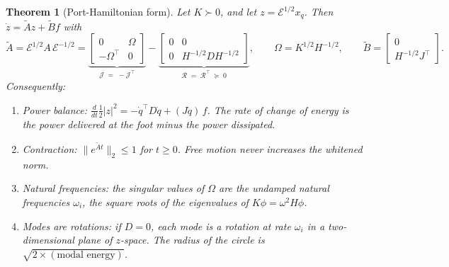 \documentclass[11pt]{article}
\newtheorem{theorem}{Theorem}
\theoremstyle{definition}
\theoremstyle{remark}
\newcommand{\Em}{\mathcal{E}}         %
\newcommand{\At}{\tilde{A}}
\newcommand{\Jt}{\mathcal{J}}
\newcommand{\Rt}{\mathcal{R}}
\begin{document}
\begin{theorem}[Port-Hamiltonian form]\label{thm:ph}
Let $K\succ0$, and let $z=\Em^{1/2}x_q$. Then $\dot z=\At z+\tilde Bf$ with
\begin{equation}\label{eq:ph}
  \At=\Em^{1/2}A\,\Em^{-1/2}
  =\underbrace{\begin{bmatrix}0&\Omega\\-\Omega^\top&0\end{bmatrix}}_{\Jt\;=\;-\Jt^\top}
  -\underbrace{\begin{bmatrix}0&0\\0&H^{-1/2}DH^{-1/2}\end{bmatrix}}_{\Rt\;=\;\Rt^\top\;\succeq\;0},
  \qquad \Omega=K^{1/2}H^{-1/2},\qquad
  \tilde B=\begin{bmatrix}0\\H^{-1/2}J^\top\end{bmatrix}.
\end{equation}
Consequently:
\begin{enumerate}[label=(\alph*)]
  \item \emph{Power balance:}
        $\frac{d}{dt}\frac12|z|^2=-\dot q^\top D\dot q+(J\dot q)\,f$. The rate of change
        of energy is the power delivered at the foot minus the power dissipated.
  \item \emph{Contraction:} $\|e^{\At t}\|_2\le1$ for $t\ge0$. Free motion never increases
        the whitened norm.
  \item \emph{Natural frequencies:} the singular values of $\Omega$ are the undamped
        natural frequencies $\omega_i$, the square roots of the eigenvalues of
        $K\phi=\omega^2H\phi$.
  \item \emph{Modes are rotations:} if $D=0$, each mode is a rotation at rate $\omega_i$
        in a two-dimensional plane of $z$-space. The radius of the circle is
        $\sqrt{2\times(\text{modal energy})}$.
\end{enumerate}
\end{theorem}
\end{document}
